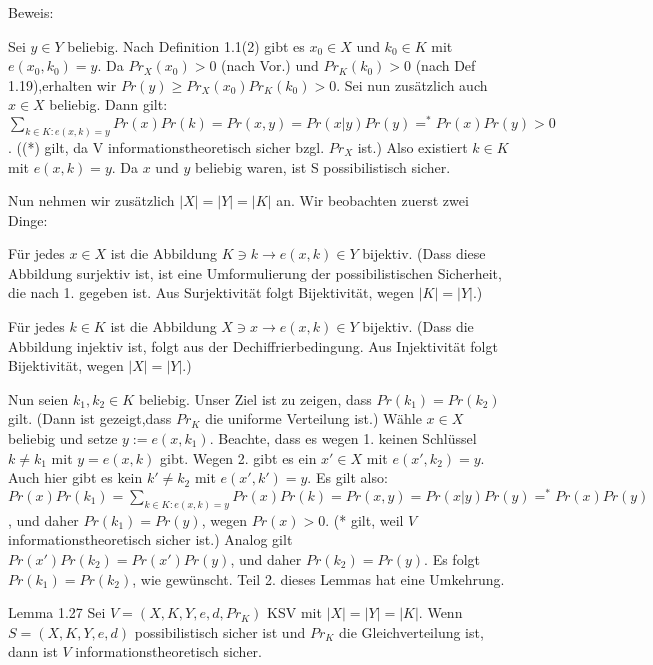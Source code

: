 \documentclass[a4paper]{article}
\begin{document}
\begin{multicols}{3}
    Beweis:
    \begin{enumerate*}
        \item Sei $y\in Y$ beliebig. Nach Definition 1.1(2) gibt es $x_0\in X$ und $k_0\in K$ mit $e(x_0,k_0)=y$. Da $Pr_X(x_0)>0$ (nach Vor.) und $Pr_K(k_0)>0$ (nach Def 1.19),erhalten wir $Pr(y)\geq Pr_X(x_0)Pr_K(k_0)>0$. Sei nun zusätzlich auch $x\in X$ beliebig. Dann gilt: $\sum_{k\in K:e(x,k)=y} Pr(x)Pr(k)= Pr(x,y)= Pr(x|y)Pr(y)=^* Pr(x)Pr(y)> 0$. ((*) gilt, da V informationstheoretisch sicher bzgl. $Pr_X$ ist.) Also existiert $k\in K$ mit $e(x,k)=y$. Da $x$ und $y$ beliebig waren, ist S possibilistisch sicher.
        \item  Nun nehmen wir zusätzlich $|X|=|Y|=|K|$ an. Wir beobachten zuerst zwei Dinge:
        \begin{enumerate*}
            \item Für jedes $x\in X$ ist die Abbildung $K\ni k \rightarrow e(x,k)\in Y$  bijektiv. (Dass diese Abbildung surjektiv ist, ist eine Umformulierung der possibilistischen Sicherheit, die nach 1. gegeben ist. Aus Surjektivität folgt Bijektivität, wegen $|K|=|Y|$.)
            \item  Für jedes $k\in K$ ist die Abbildung $X\ni x \rightarrow e(x,k)\in Y$ bijektiv. (Dass die Abbildung injektiv ist, folgt aus der Dechiffrierbedingung. Aus Injektivität folgt Bijektivität, wegen $|X|=|Y|$.)
        \end{enumerate*}
    \end{enumerate*}

    Nun seien $k_1,k_2\in K$ beliebig. Unser Ziel ist zu zeigen, dass $Pr(k_1)=Pr(k_2)$ gilt. (Dann ist gezeigt,dass $Pr_K$ die uniforme Verteilung ist.) Wähle $x\in X$ beliebig und setze $y:=e(x,k_1)$. Beachte, dass es wegen 1. keinen Schlüssel $k\not=k_1$ mit $y=e(x,k)$ gibt. Wegen 2. gibt es ein $x'\in X$ mit $e(x',k_2)=y$. Auch hier gibt es kein $k'\not=k_2$ mit $e(x',k')=y$. Es gilt also: $Pr(x)Pr(k_1)=\sum_{k\in K:e(x,k)=y} Pr(x)Pr(k) = Pr(x,y) = Pr(x|y)Pr(y) =^* Pr(x)Pr(y)$, und daher $Pr(k_1)=Pr(y)$, wegen $Pr(x)>0$. (* gilt, weil $V$ informationstheoretisch sicher ist.) Analog gilt $Pr(x')Pr(k_2)=Pr(x')Pr(y)$, und daher $Pr(k_2)=Pr(y)$. Es folgt $Pr(k_1)=Pr(k_2)$, wie gewünscht.
    Teil 2. dieses Lemmas hat eine Umkehrung.

    Lemma 1.27 Sei $V=(X,K,Y,e,d,Pr_K)$ KSV mit $|X|=|Y|=|K|$. Wenn $S=(X,K,Y,e,d)$ possibilistisch sicher ist und $Pr_K$ die Gleichverteilung ist, dann ist $V$ informationstheoretisch sicher.


\end{multicols}
\end{document}
